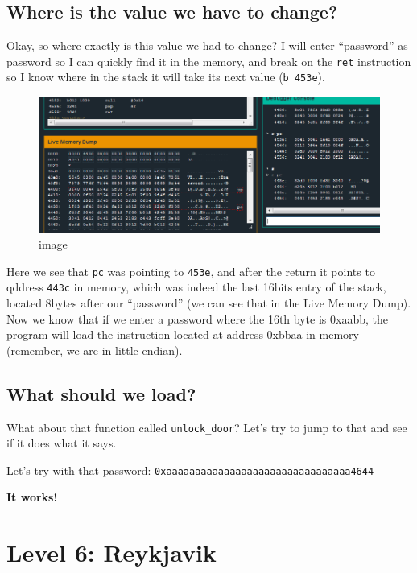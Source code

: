 \documentclass[a4paper,11pt]{article}
\begin{document}
\subsection{Where is the value we have to
change?}\label{where-is-the-value-we-have-to-change}

Okay, so where exactly is this value we had to change? I will enter
``password'' as password so I can quickly find it in the memory, and
break on the \texttt{ret} instruction so I know where in the stack it
will take its next value (\texttt{b 453e}).

\begin{figure}[htbp]
\centering
\includegraphics{img/4_1.PNG}
\caption{image}
\end{figure}

Here we see that \texttt{pc} was pointing to \texttt{453e}, and after
the return it points to qddress \texttt{443c} in memory, which was
indeed the last 16bits entry of the stack, located 8bytes after our
``password'' (we can see that in the Live Memory Dump). Now we know that
if we enter a password where the 16th byte is 0xaabb, the program will
load the instruction located at address 0xbbaa in memory (remember, we
are in little endian).

\subsection{What should we load?}\label{what-should-we-load}

What about that function called \texttt{unlock\_door}? Let's try to jump
to that and see if it does what it says.

Let's try with that password:
\texttt{0xaaaaaaaaaaaaaaaaaaaaaaaaaaaaaaaa4644}

\textbf{It works!}

\section{Level 6: Reykjavik}\label{level-6-reykjavik}
\end{document}
